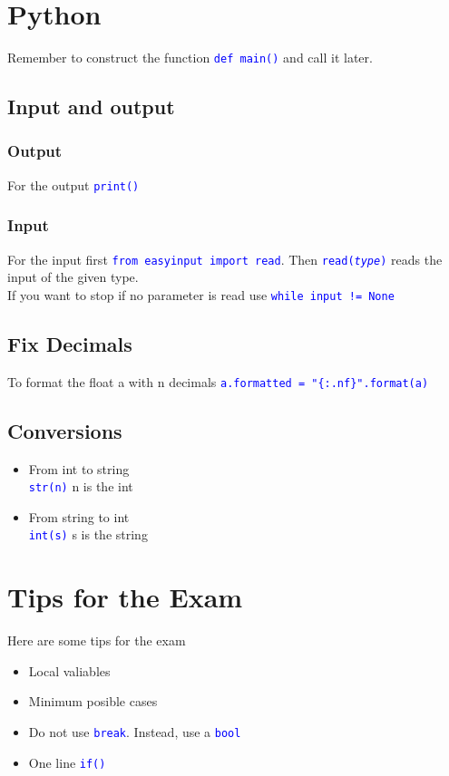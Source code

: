 \documentclass[12pt]{article}
\newcommand{\code}[1]{\colorbox{light-gray}{\texttt{\textcolor{blue}{#1}}}}
\begin{document}
\section{Python}
Remember to construct the function \code{def main()} and call it later.
\subsection{Input and output}
\subsubsection{Output}
For the output \code{print()} 
\subsubsection{Input}
For the input first \code{from easyinput import read}. Then \code{read(\textit{type})} reads the input of the given type.\\ 
If you want to stop if no parameter is read use \code{while input != None}

\subsection{Fix Decimals}
To format the float a with n decimals
\code{a.formatted = "\{:.nf\}".format(a)}

\subsection{Conversions}
\begin{itemize}
	\item From int to string \\
	\code{str(n)} n is the int
	\item From string to int \\
	\code{int(s)} s is the string
\end{itemize}

\section{Tips for the Exam}
Here are some tips for the exam
\begin{itemize}
	\item Local valiables
	\item Minimum posible cases
	\item Do not use \code{break}. Instead, use a \code{bool}
	\item One line \code{if()}
\end{itemize}
\end{document}
